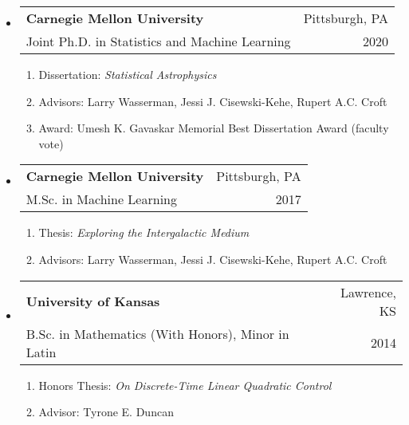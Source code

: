\documentclass[letterpaper,10pt]{extarticle}
\makeatletter
\newcommand{\subheadingtwolines}[4]{
\begin{tabular*}{6.55in}{l@{\cftdotfill{\cftsecdotsep}\extracolsep{\fill}}r}
#1 & #2 \\
#3 & #4 \\
\end{tabular*}}
\makeatother
\begin{document}
\begin{itemize}[leftmargin=0.3cm, rightmargin=0cm, itemsep=0.5cm]
\item[] \hspace{-2ex}\subheadingtwolines{{\bf Carnegie Mellon University}}{Pittsburgh, PA}{Joint Ph.D. in Statistics and Machine Learning}{2020}
\begin{enumerate}[leftmargin=0.5cm,itemsep=0.02cm]
	\item[] \hspace{-2ex}Dissertation: {\it Statistical Astrophysics}%
	\item[] \hspace{-2ex}Advisors: Larry Wasserman, Jessi J. Cisewski-Kehe, Rupert A.C. Croft
	\item[] \hspace{-2ex}Award: Umesh K. Gavaskar Memorial Best Dissertation Award (faculty vote)
\end{enumerate}
\vspace{-0.25cm}

\item[] \hspace{-2ex}\subheadingtwolines{{\bf Carnegie Mellon University}}{Pittsburgh, PA}{M.Sc. in Machine Learning}{2017}
\begin{enumerate}[leftmargin=0.5cm,itemsep=0.02cm]
	\item[] \hspace{-2ex}Thesis: {\it Exploring the Intergalactic Medium}
		\vspace{-.05cm}
	\item[] \hspace{-2ex}Advisors: Larry Wasserman, Jessi J. Cisewski-Kehe, Rupert A.C. Croft
\end{enumerate}

\item[] \hspace{-2ex}\subheadingtwolines{{\bf University of Kansas}}{Lawrence, KS}{B.Sc. in Mathematics (With Honors), Minor in Latin}{2014}
\begin{enumerate}[leftmargin=0.5cm,itemsep=0.02cm]
	\item[] \hspace{-2ex}Honors Thesis: {\it On Discrete-Time Linear Quadratic Control}
		\vspace{-.05cm}
	\item[] \hspace{-2ex}Advisor: Tyrone E. Duncan
\end{enumerate}
\end{itemize}
\end{document}
